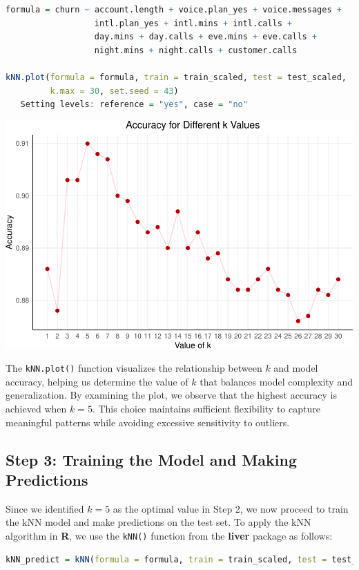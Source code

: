 \documentclass[
]{book}
\newcommand{\passthrough}[1]{#1}
\theoremstyle{definition}
\theoremstyle{definition}
\theoremstyle{definition}
\theoremstyle{definition}
\theoremstyle{remark}
\begin{document}
\begin{lstlisting}[language=R]
formula = churn ~ account.length + voice.plan_yes + voice.messages + 
                  intl.plan_yes + intl.mins + intl.calls + 
                  day.mins + day.calls + eve.mins + eve.calls + 
                  night.mins + night.calls + customer.calls

kNN.plot(formula = formula, train = train_scaled, test = test_scaled, 
         k.max = 30, set.seed = 43)
   Setting levels: reference = "yes", case = "no"
\end{lstlisting}

\begin{center}\includegraphics[width=0.7\linewidth]{knn_files/figure-latex/unnamed-chunk-7-1} \end{center}

The \passthrough{\lstinline!kNN.plot()!} function visualizes the relationship between \(k\) and model accuracy, helping us determine the value of \(k\) that balances model complexity and generalization. By examining the plot, we observe that the highest accuracy is achieved when \(k = 5\). This choice maintains sufficient flexibility to capture meaningful patterns while avoiding excessive sensitivity to outliers.

\subsection{Step 3: Training the Model and Making Predictions}\label{step-3-training-the-model-and-making-predictions}

Since we identified \(k = 5\) as the optimal value in Step 2, we now proceed to train the kNN model and make predictions on the test set. To apply the kNN algorithm in \textbf{R}, we use the \passthrough{\lstinline!kNN()!} function from the \textbf{liver} package as follows:

\begin{lstlisting}[language=R]
kNN_predict = kNN(formula = formula, train = train_scaled, test = test_scaled, k = 5)
\end{lstlisting}
\end{document}
